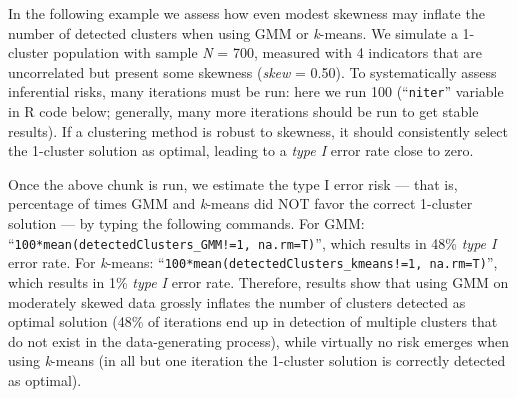 \documentclass[
  man,floatsintext]{apa6}
\newenvironment{Shaded}{\begin{snugshade}}{\end{snugshade}}
\newcommand{\AttributeTok}[1]{\textcolor[rgb]{0.13,0.29,0.53}{#1}}
\newcommand{\CommentTok}[1]{\textcolor[rgb]{0.56,0.35,0.01}{\textit{#1}}}
\newcommand{\ConstantTok}[1]{\textcolor[rgb]{0.56,0.35,0.01}{#1}}
\newcommand{\ControlFlowTok}[1]{\textcolor[rgb]{0.13,0.29,0.53}{\textbf{#1}}}
\newcommand{\DecValTok}[1]{\textcolor[rgb]{0.00,0.00,0.81}{#1}}
\newcommand{\FloatTok}[1]{\textcolor[rgb]{0.00,0.00,0.81}{#1}}
\newcommand{\FunctionTok}[1]{\textcolor[rgb]{0.13,0.29,0.53}{\textbf{#1}}}
\newcommand{\NormalTok}[1]{#1}
\newcommand{\OtherTok}[1]{\textcolor[rgb]{0.56,0.35,0.01}{#1}}
\newcommand{\SpecialCharTok}[1]{\textcolor[rgb]{0.81,0.36,0.00}{\textbf{#1}}}
\begin{document}
In the following example we assess how even modest skewness may inflate the number of detected clusters when using GMM or \emph{k}-means. We simulate a 1-cluster population with sample \emph{N} = 700, measured with 4 indicators that are uncorrelated but present some skewness (\emph{skew} = 0.50). To systematically assess inferential risks, many iterations must be run: here we run 100 (``\texttt{niter}'' variable in R code below; generally, many more iterations should be run to get stable results). If a clustering method is robust to skewness, it should consistently select the 1-cluster solution as optimal, leading to a \emph{type I} error rate close to zero.

\begin{Shaded}
\end{Shaded}

Once the above chunk is run, we estimate the type I error risk --- that is, percentage of times GMM and \emph{k}-means did NOT favor the correct 1-cluster solution --- by typing the following commands. For GMM: ``\texttt{100*mean(detectedClusters\_GMM!=1,\ na.rm=T)}'', which results in 48\% \emph{type I} error rate. For \emph{k}-means: ``\texttt{100*mean(detectedClusters\_kmeans!=1,\ na.rm=T)}'', which results in 1\% \emph{type I} error rate. Therefore, results show that using GMM on moderately skewed data grossly inflates the number of clusters detected as optimal solution (48\% of iterations end up in detection of multiple clusters that do not exist in the data-generating process), while virtually no risk emerges when using \emph{k}-means (in all but one iteration the 1-cluster solution is correctly detected as optimal).
\end{document}
